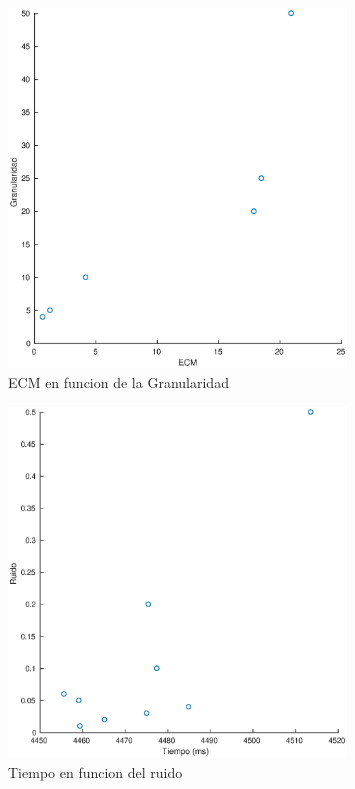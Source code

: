 \begin{figure}[H]
	\centering	\includegraphics[width=0.8\textwidth]{img/granu_ecm}
	\caption{ECM en funcion de la Granularidad}
	\label{fig:etiqueta}
\end{figure}

\begin{figure}[H]
	\centering	\includegraphics[width=0.8\textwidth]{img/ruido_tiempo}
	\caption{Tiempo en funcion del ruido}
	\label{fig:etiqueta}
\end{figure}


